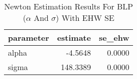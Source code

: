 \begin{table}[htbp]
    \centering
    \caption{Newton Estimation Results For BLP ($\alpha$ And $\sigma$) With EHW SE}
    \label{tab:blp_q8_newton_results}
\toprule
\begin{tabular}{lrr}
\toprule
parameter & estimate & se_ehw \\
\midrule
\midrule
alpha & -4.5648 & 0.0000 \\
sigma & 148.3389 & 0.0000 \\
\bottomrule
\bottomrule
\end{tabular}

\end{table}
